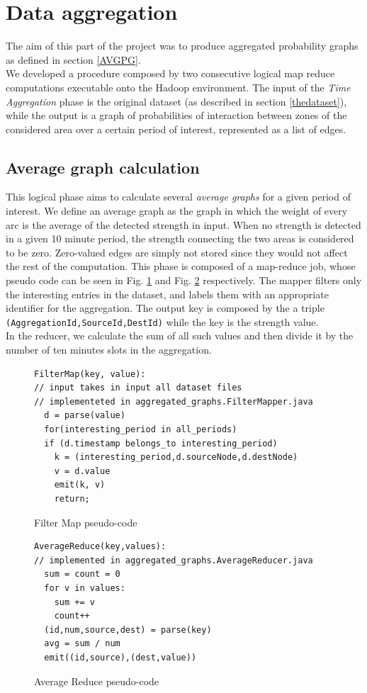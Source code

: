 \section{Data aggregation}
\label{aggregation}
The aim of this part of the project was to produce aggregated probability graphs as defined in section \ref{AVGPG}.
\\ 
We developed a procedure composed by two consecutive logical map reduce computations executable onto the Hadoop environment.
The input of the \emph{Time Aggregation} phase is the original dataset (as described in section \ref{thedataset}), while the output is a graph of probabilities of interaction between zones of the considered area
over a certain period of interest, represented as a list of edges.
\subsection{Average graph calculation}
This logical phase aims to calculate several \emph{average graphs} for a given period of interest.
We define an average graph as the graph in which the weight of every arc is the average of the detected strength in input. When no strength is detected in a given 10 minute period, the strength connecting the two areas is considered to be zero. Zero-valued
edges are simply not stored since they would not affect the rest of the computation.
This phase is composed of a map-reduce job, whose pseudo code can be seen in Fig. \ref{fig:filtermap} and Fig. \ref{fig:averagereduce} respectively.
The mapper filters only the interesting entries in the dataset, and labels them with an appropriate identifier for the aggregation. The output key is composed by the  a triple \texttt{(AggregationId,SourceId,DestId)} while the key is the strength value.\\
In the reducer, we calculate the sum of all such values and then divide it by the number of ten minutes slots in the aggregation.

\begin{figure}
\begin{verbatim}
FilterMap(key, value):
// input takes in input all dataset files
// implementeted in aggregated_graphs.FilterMapper.java
  d = parse(value)
  for(interesting_period in all_periods)
  if (d.timestamp belongs_to interesting_period)
  	k = (interesting_period,d.sourceNode,d.destNode)
  	v = d.value
    emit(k, v)
    return;
\end{verbatim}
\caption{Filter Map pseudo-code}
\label{fig:filtermap}
\end{figure}
\begin{figure}
\begin{verbatim}
AverageReduce(key,values):
// implemented in aggregated_graphs.AverageReducer.java
  sum = count = 0
  for v in values:
  	sum += v
  	count++
  (id,num,source,dest) = parse(key)
  avg = sum / num
  emit((id,source),(dest,value))
\end{verbatim}
\caption{Average Reduce pseudo-code}
\label{fig:averagereduce}
\end{figure} 

